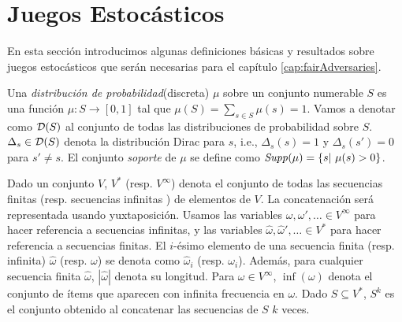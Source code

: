 \section{Juegos Estocásticos}
En esta sección introducimos algunas definiciones básicas y resultados sobre juegos estocásticos que serán necesarias para el capítulo \ref{cap:fairAdversaries}.

Una \emph{distribución de probabilidad}(discreta) $\mu$ sobre un conjunto numerable $S$ es una función $\mu: S \rightarrow [0, 1] $  tal que 
$\mu(S) = \sum_{s \in S} \mu(s) = 1$. 
Vamos a denotar como $\mathcal{D}(S)$ al conjunto de todas las distribuciones de probabilidad sobre $S$. $\Delta_s \in \mathcal{D}(S)$ denota la distribución Dirac para $s$, i.e., 
$\Delta_s(s) =1$ y $\Delta_s(s') = 0$ para $s'\neq s$.
El conjunto \textit{soporte} de $\mu$ se define como $\mathit{Supp}(\mu) = \{s |~\mu (s) > 0\}$.

Dado un conjunto $V$, $V^*$ (resp. $V^\infty$) denota el conjunto de todas las secuencias finitas (resp. secuencias infinitas ) de elementos de $V$. La concatenación será representada usando yuxtaposición. Usamos las variables $\omega, \omega', \dots \in V^\infty$ para hacer referencia a secuencias infinitas, y las variables $\hat{\omega}, \hat{\omega}', \dots \in V^*$ para hacer referencia a secuencias finitas. El $i$-ésimo elemento de una secuencia finita (resp. infinita) $\hat{\omega}$ (resp. $\omega$) se denota como
$\hat{\omega}_i$ (resp. $\omega_i$). Además, para cualquier secuencia finita $\hat{\omega}$, $|\hat{\omega}|$ denota su longitud. Para $\omega \in V^\infty$, $\inf(\omega)$ denota el conjunto de ítems que aparecen con infinita frecuencia en $\omega$. Dado
$S \subseteq V^*$, $S^k$ es el conjunto obtenido al concatenar las secuencias de $S$ $k$ veces.
	 
